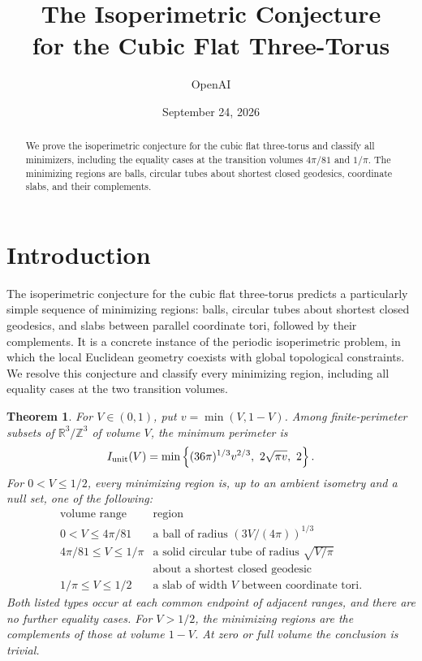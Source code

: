 \documentclass[11pt]{article}
\title{The Isoperimetric Conjecture\\for the Cubic Flat Three-Torus}
\author{OpenAI}
\date{September 24, 2026}
\newtheorem{theorem}{Theorem}[section]
\theoremstyle{remark}
\numberwithin{equation}{section}
\begin{document}
\maketitle
\vspace{-2em}
\begin{abstract}
We prove the isoperimetric conjecture for the cubic flat three-torus
and classify all minimizers, including the equality cases at the
transition volumes $4\pi/81$ and $1/\pi$. The minimizing regions are balls,
circular tubes about shortest closed geodesics, coordinate slabs, and
their complements.
\end{abstract}

\section{Introduction}
\label{intro:section}

The isoperimetric conjecture for the cubic flat three-torus predicts a
particularly simple sequence of minimizing regions: balls, circular tubes
about shortest closed geodesics, and slabs between parallel coordinate tori,
followed by their complements.  It is a concrete instance of the periodic
isoperimetric problem, in which the local Euclidean geometry coexists with
global topological constraints.  We resolve this conjecture and classify
every minimizing region, including all equality cases at the two transition
volumes.

\begin{theorem}\label{intro:main}
For \(V\in(0,1)\), put \(v=\min(V,1-V)\).
Among finite-perimeter subsets of \(\mathbb R^3/\mathbb Z^3\)
of volume \(V\), the minimum perimeter is
\begin{equation}
 I_{\rm unit}(V)=
 \min\left\{(36\pi)^{1/3}v^{2/3},\ 2\sqrt{\pi v},\ 2\right\}.
 \label{intro:profile}
\end{equation}
For \(0<V\le1/2\), every minimizing region is, up to an ambient
isometry and a null set, one of the following:
\[
\begin{array}{c|c}
\text{volume range}&\text{region}\\ \hline
0<V\le 4\pi/81 & \text{a ball of radius }(3V/(4\pi))^{1/3}\\[2pt]
4\pi/81\le V\le1/\pi
 &\text{a solid circular tube of radius }\sqrt{V/\pi}\\
 &\text{about a shortest closed geodesic}\\[2pt]
1/\pi\le V\le1/2
 &\text{a slab of width }V\text{ between coordinate tori}.
\end{array}
\]
Both listed types occur at each common endpoint of adjacent ranges,
and there are no further equality cases.
For \(V>1/2\), the minimizing regions are the complements of those
at volume \(1-V\). At zero or full volume the conclusion is trivial.
\end{theorem}
\end{document}
